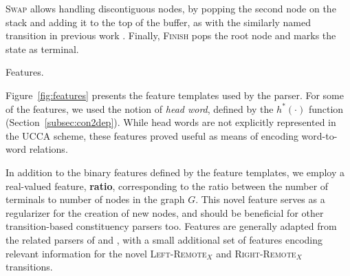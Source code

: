 \documentclass[11pt]{article}
\makeatletter
\newcommand{\secref}[1]{Section~\ref{#1}}
\newcommand{\figref}[1]{Figure~\ref{#1}}
\renewcommand{\paragraph}{
  \@startsection{paragraph}{4}
  {\z@}{.5ex \@plus .5ex \@minus .2ex}{-1em}
  {\normalfont\normalsize\bfseries}
}
\makeatother
\begin{document}
\textsc{Swap} allows handling discontiguous nodes, by popping the second
node on the stack and adding it to the top of the buffer, as with the similarly
named transition in previous work \cite{nivre2009non,maier2015discontinuous}.
Finally, \textsc{Finish} pops the root node and marks the state as terminal.

\paragraph{Features.}
\label{subsec:features}

\figref{fig:features} presents the feature templates used by the parser.
For some of the features, we used the notion of \textit{head word},
defined by the $h^*(\cdot)$ function (\secref{subsec:con2dep}).
While head words are not explicitly represented in the UCCA scheme, these
features proved useful as means of encoding word-to-word relations.

In addition to the binary features defined by the feature templates,
we employ a real-valued feature, \textbf{ratio}, corresponding to the ratio between the number of terminals to number of nodes
in the graph $G$. This novel feature serves as a regularizer for the creation of new nodes, and should be beneficial for other transition-based constituency parsers too.
Features are generally adapted from the related parsers of  and
, with a small additional set of features encoding relevant information
for the novel \textsc{Left-Remote$_X$} and \textsc{Right-Remote$_X$} transitions.


\end{document}
